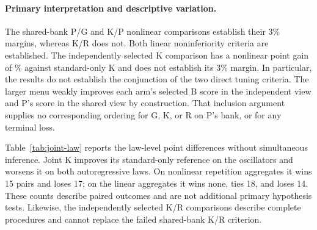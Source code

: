 \begin{table}[tbp]
\centering\small
\setlength{\tabcolsep}{4pt}

\caption{Complete six-comparison primary family. The first four
comparisons use P's selected common bank. The last two compare
independently selected K procedures on the identical cohort.
Gain is positive when candidate mean loss is lower; $U$ is the
simultaneous upper bound for the margin-adjusted paired difference.
The criterion is established only when $U<0$.}
\label{supp:joint-primary}
\end{table}

\paragraph{Primary interpretation and descriptive variation.}
The shared-bank P/G and K/P nonlinear comparisons establish their
3\% margins, whereas K/R does not. Both linear noninferiority
criteria are established. The independently selected K comparison
has a nonlinear point gain of \JSGainJointKNonlinear\% against
standard-only K and does not establish its 3\% margin. In particular,
the results do not establish the conjunction of the two direct
tuning criteria. The larger menu weakly improves each arm's selected
B score in the independent view and P's score in the shared view
by construction. That inclusion argument supplies no corresponding
ordering for G, K, or R on P's bank, or for any terminal loss.

Table~\ref{tab:joint-law} reports the law-level point differences
without simultaneous inference. Joint K improves its standard-only
reference on the oscillators and worsens it on both autoregressive
laws. On nonlinear repetition aggregates it wins 15 pairs and loses
17; on the linear aggregates it wins none, ties 18, and loses 14.
These counts describe paired outcomes and are not additional
primary hypothesis tests. Likewise, the independently selected
K/R comparisons describe complete procedures and cannot replace
the failed shared-bank K/R criterion.

\begin{table}[tbp]
\centering\small
\setlength{\tabcolsep}{4pt}

\caption{Descriptive law-level comparisons of independently selected
procedures. Standard K selects its cap among the five standardized
candidates; joint K and joint R select among all fifteen candidates.
Gains use ratios of mean losses, with positive values favoring K
in the indicated comparison. No law-level margin is established
by this table.}
\label{tab:joint-law}
\end{table}

